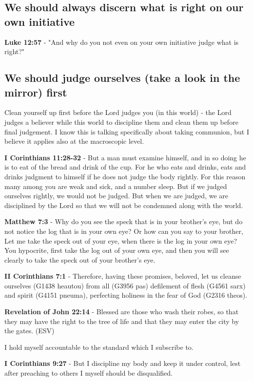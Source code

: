 \documentclass[11pt]{article}
\begin{document}
\subsection{We should always discern what is right on our own initiative}
\label{sec:orgd04eb65}
\textbf{Luke 12:57} - "And why do you not even on your own initiative judge what is right?"

\subsection{We should judge ourselves (take a look in the mirror) first}
\label{sec:org8e47a44}
Clean yourself up first before the Lord judges you (in this world) - the Lord judges a believer while this world to discipline them and clean them up before final judgement.
I know this is talking specifically about taking communion, but I believe it applies also at the macroscopic level.

\textbf{I Corinthians 11:28-32} - But a man must examine himself, and in so doing he is to eat of the bread and drink of the cup.  For he who eats and drinks, eats and drinks judgment to himself if he does not judge the body rightly.  For this reason many among you are weak and sick, and a number sleep.  But if we judged ourselves rightly, we would not be judged.  But when we are judged, we are disciplined by the Lord so that we will not be condemned along with the world.

\textbf{Matthew 7:3} - Why do you see the speck that is in your brother's eye, but do not notice the log that is in your own eye?  Or how can you say to your brother, Let me take the speck out of your eye, when there is the log in your own eye?  You hypocrite, first take the log out of your own eye, and then you will see clearly to take the speck out of your brother's eye.

\textbf{II Corinthians 7:1} - Therefore, having these promises, beloved, let us cleanse ourselves (G1438 heautou) from all (G3956 pas) defilement of flesh (G4561 sarx) and spirit (G4151 pneuma), perfecting holiness in the fear of God (G2316 theos).

\textbf{Revelation of John 22:14} - Blessed are those who wash their robes, so that they may have the right to the tree of life and that they may enter the city by the gates. (ESV)

I hold myself accountable to the standard which I subscribe to.

\textbf{I Corinthians 9:27} - But I discipline my body and keep it under control, lest after preaching to others I myself should be disqualified.
\end{document}
